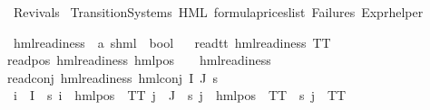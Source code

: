 %
\begin{isabellebody}%
%
%
\isadelimtheory
%
\endisadelimtheory
%
\isatagtheory
{}\isamarkupfalse%
\ Revivals\isanewline
{}\ Transition{\isacharunderscore}{\kern0pt}Systems\ HML\ formula{\isacharunderscore}{\kern0pt}prices{\isacharunderscore}{\kern0pt}list\ Failures\ Expr{\isacharunderscore}{\kern0pt}helper\isanewline
{}%
\endisatagtheory
{\isafoldtheory}%
%
\isadelimtheory
%
\endisadelimtheory
%
\isadelimdocument
%
\endisadelimdocument
%
\isatagdocument
%
\isamarkuptrue%
%
\endisatagdocument
{\isafolddocument}%
%
\isadelimdocument
%
\endisadelimdocument
%
\begin{isamarkuptext}%
%
\end{isamarkuptext}\isamarkuptrue%
\isamarkupfalse%
\ hml{\isacharunderscore}{\kern0pt}readiness\ {\isacharcolon}{\kern0pt}{\isacharcolon}{\kern0pt}\ {\isachardoublequoteopen}{\isacharparenleft}{\kern0pt}{\isacharprime}{\kern0pt}a{\isacharcomma}{\kern0pt}\ {\isacharprime}{\kern0pt}s{\isacharparenright}{\kern0pt}hml\ {\isasymRightarrow}\ bool{\isachardoublequoteclose}\isanewline
\ \ \isanewline
read{\isacharunderscore}{\kern0pt}tt{\isacharcolon}{\kern0pt}\ {\isachardoublequoteopen}hml{\isacharunderscore}{\kern0pt}readiness\ TT{\isachardoublequoteclose}\ {\isacharbar}{\kern0pt}\isanewline
read{\isacharunderscore}{\kern0pt}pos{\isacharcolon}{\kern0pt}\ {\isachardoublequoteopen}hml{\isacharunderscore}{\kern0pt}readiness\ {\isacharparenleft}{\kern0pt}hml{\isacharunderscore}{\kern0pt}pos\ {\isasymalpha}\ {\isasymphi}{\isacharparenright}{\kern0pt}{\isachardoublequoteclose}\ \ {\isachardoublequoteopen}hml{\isacharunderscore}{\kern0pt}readiness\ {\isasymphi}{\isachardoublequoteclose}\ {\isacharbar}{\kern0pt}\isanewline
read{\isacharunderscore}{\kern0pt}conj{\isacharcolon}{\kern0pt}\ {\isachardoublequoteopen}hml{\isacharunderscore}{\kern0pt}readiness\ {\isacharparenleft}{\kern0pt}hml{\isacharunderscore}{\kern0pt}conj\ I\ J\ {\isasympsi}s{\isacharparenright}{\kern0pt}{\isachardoublequoteclose}\ \isanewline
{}\ {\isachardoublequoteopen}{\isasymforall}i\ {\isasymin}\ I{\isachardot}{\kern0pt}\ {\isacharparenleft}{\kern0pt}{\isasymexists}{\isasymalpha}{\isachardot}{\kern0pt}\ {\isacharparenleft}{\kern0pt}{\isacharparenleft}{\kern0pt}{\isasympsi}s\ i{\isacharparenright}{\kern0pt}\ {\isacharequal}{\kern0pt}\ hml{\isacharunderscore}{\kern0pt}pos\ {\isasymalpha}\ TT{\isacharparenright}{\kern0pt}{\isacharparenright}{\kern0pt}{\isachardoublequoteclose}\ {\isachardoublequoteopen}{\isacharparenleft}{\kern0pt}{\isasymforall}j\ {\isasymin}\ J{\isachardot}{\kern0pt}\ {\isacharparenleft}{\kern0pt}{\isasymexists}{\isasymalpha}{\isachardot}{\kern0pt}\ {\isacharparenleft}{\kern0pt}{\isacharparenleft}{\kern0pt}{\isasympsi}s\ j{\isacharparenright}{\kern0pt}\ {\isacharequal}{\kern0pt}\ hml{\isacharunderscore}{\kern0pt}pos\ {\isasymalpha}\ TT{\isacharparenright}{\kern0pt}{\isacharparenright}{\kern0pt}\ {\isasymor}\ {\isasympsi}s\ j\ {\isacharequal}{\kern0pt}\ TT{\isacharparenright}{\kern0pt}{\isachardoublequoteclose}\ \isanewline

\end{isabellebody}
